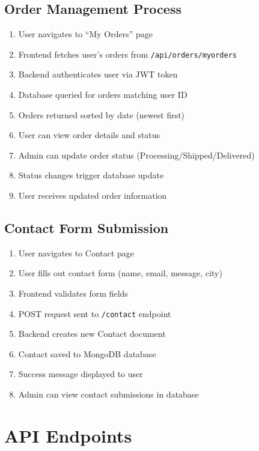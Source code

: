 \documentclass[12pt,a4paper]{article}
\begin{document}
\subsection{Order Management Process}

\begin{enumerate}[label=\textbf{Step \arabic*:}]
    \item User navigates to ``My Orders'' page
    \item Frontend fetches user's orders from \texttt{/api/orders/myorders}
    \item Backend authenticates user via JWT token
    \item Database queried for orders matching user ID
    \item Orders returned sorted by date (newest first)
    \item User can view order details and status
    \item Admin can update order status (Processing/Shipped/Delivered)
    \item Status changes trigger database update
    \item User receives updated order information
\end{enumerate}

\subsection{Contact Form Submission}

\begin{enumerate}[label=\textbf{Step \arabic*:}]
    \item User navigates to Contact page
    \item User fills out contact form (name, email, message, city)
    \item Frontend validates form fields
    \item POST request sent to \texttt{/contact} endpoint
    \item Backend creates new Contact document
    \item Contact saved to MongoDB database
    \item Success message displayed to user
    \item Admin can view contact submissions in database
\end{enumerate}

\newpage
\section{API Endpoints}
\end{document}
